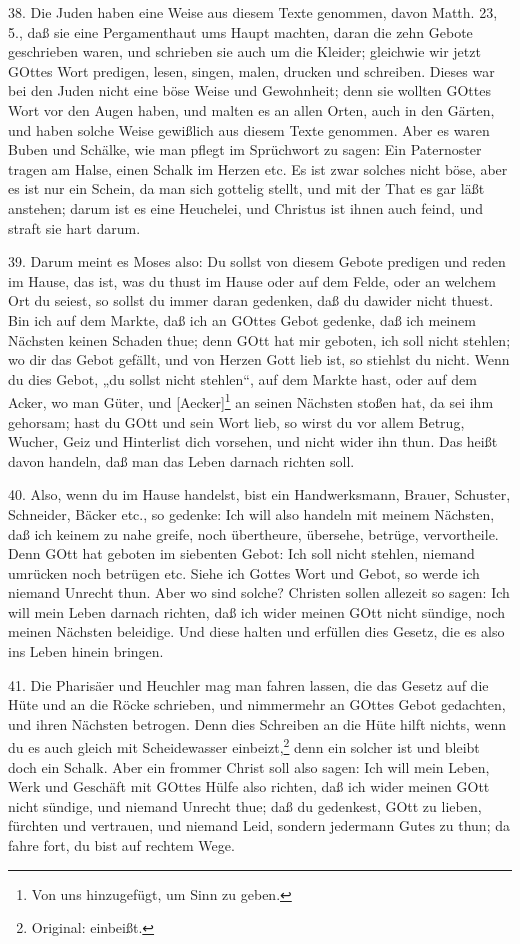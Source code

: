 38. Die Juden haben eine Weise aus diesem Texte genommen, davon Matth. 23, 5., daß sie eine Pergamenthaut ums Haupt machten, daran die zehn Gebote geschrieben waren, und schrieben sie auch um die Kleider; gleichwie wir jetzt GOttes Wort predigen, lesen, singen, malen, drucken und schreiben. Dieses war bei den Juden nicht eine böse Weise und Gewohnheit; denn sie wollten GOttes Wort vor den Augen haben, und malten es an allen Orten, auch in den Gärten, und haben solche Weise gewißlich aus diesem Texte genommen. Aber es waren Buben und Schälke, wie man pflegt im Sprüchwort zu sagen: Ein Paternoster tragen am Halse, einen Schalk im Herzen etc. Es ist zwar solches nicht böse, aber es ist nur ein Schein, da man sich gottelig stellt, und mit der That es gar läßt anstehen; darum ist es eine Heuchelei, und Christus ist ihnen auch feind, und straft sie hart darum.

39. Darum meint es Moses also: Du sollst von diesem Gebote predigen und reden im Hause, das ist, was du thust im Hause oder auf dem Felde, oder an welchem Ort du seiest, so sollst du immer daran gedenken, daß du dawider nicht thuest. Bin ich auf dem Markte, daß ich an GOttes Gebot gedenke, daß ich meinem Nächsten keinen Schaden thue; denn GOtt hat mir geboten, ich soll nicht stehlen; wo dir das Gebot gefällt, und von Herzen Gott lieb ist, so stiehlst du nicht. Wenn du dies Gebot, „du sollst nicht stehlen“, auf dem Markte hast, oder auf dem Acker, wo man Güter, und [Aecker]\footnote{Von uns hinzugefügt, um Sinn zu geben.} an seinen Nächsten stoßen hat, da sei ihm gehorsam; hast du GOtt und sein Wort lieb, so wirst du vor allem Betrug, Wucher, Geiz und Hinterlist dich vorsehen, und nicht wider ihn thun. Das heißt davon handeln, daß man das Leben darnach richten soll.

40. Also, wenn du im Hause handelst, bist ein Handwerksmann, Brauer, Schuster, Schneider, Bäcker etc., so gedenke: Ich will also handeln mit meinem Nächsten, daß ich keinem zu nahe greife, noch übertheure, übersehe, betrüge, vervortheile. Denn GOtt hat geboten im siebenten Gebot: Ich soll nicht stehlen, niemand umrücken noch betrügen etc. Siehe ich Gottes Wort und Gebot, so werde ich niemand Unrecht thun. Aber wo sind solche? Christen sollen allezeit so sagen: Ich will mein Leben darnach richten, daß ich wider meinen GOtt nicht sündige, noch meinen Nächsten beleidige. Und diese halten und erfüllen dies Gesetz, die es also ins Leben hinein bringen.

41. Die Pharisäer und Heuchler mag man fahren lassen, die das Gesetz auf die Hüte und an die Röcke schrieben, und nimmermehr an GOttes Gebot gedachten, und ihren Nächsten betrogen. Denn dies Schreiben an die Hüte hilft nichts, wenn du es auch gleich mit Scheidewasser einbeizt,\footnote{Original: einbeißt.} denn ein solcher ist und bleibt doch ein Schalk. Aber ein frommer Christ soll also sagen: Ich will mein Leben, Werk und Geschäft mit GOttes Hülfe also richten, daß ich wider meinen GOtt nicht sündige, und niemand Unrecht thue; daß du gedenkest, GOtt zu lieben, fürchten und vertrauen, und niemand Leid, sondern jedermann Gutes zu thun; da fahre fort, du bist auf rechtem Wege.

